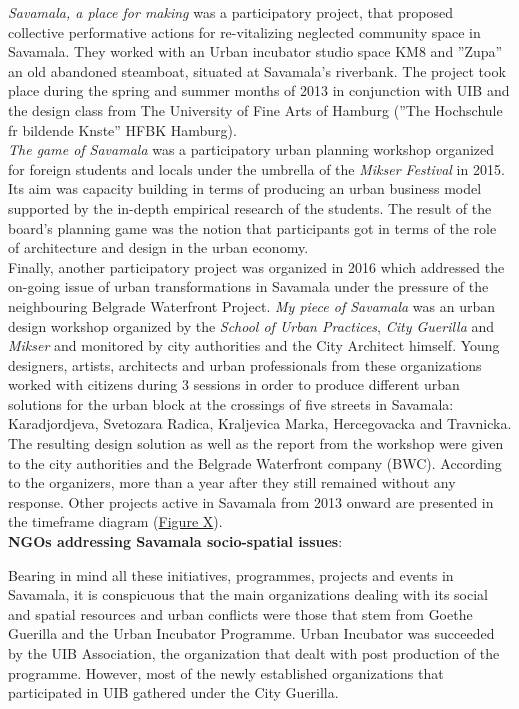 \documentclass[11pt]{report}
\begin{document}
\textit{Savamala, a place for making} was a participatory project, that proposed collective performative actions for re-vitalizing neglected community space in Savamala.
They worked with an Urban incubator studio space KM8 and ”Zupa” an old abandoned steamboat, situated at Savamala’s riverbank. The project took place during the spring and summer months of 2013 in conjunction with UIB and the design class from The University of Fine Arts of Hamburg (”The Hochschule fr bildende Knste” HFBK Hamburg).
\\

\textit{The game of Savamala} was a participatory urban planning workshop organized for foreign students and locals under the umbrella of the \textit{Mikser Festival} in 2015.
Its aim was capacity building in terms of producing an urban business model supported by the in-depth empirical research of the students. The result of the board’s planning game was the notion that participants got in terms of the role of architecture and design in the urban economy.
\\

Finally, another participatory project was organized in 2016 which addressed the on-going issue of urban transformations in Savamala under the pressure of the neighbouring Belgrade Waterfront Project.
\textit{My piece of Savamala}  was an urban design workshop organized by the \textit{School of Urban Practices}, \textit{City Guerilla} and \textit{Mikser} and monitored by city authorities and the City Architect himself.
Young designers, artists, architects and urban professionals from these organizations worked with citizens during 3 sessions in order to produce different urban solutions for the urban block at the crossings of five streets in Savamala: Karadjordjeva, Svetozara Radica, Kraljevica Marka, Hercegovacka and Travnicka. The resulting design solution as well as the report from the workshop were given to the city authorities and the Belgrade Waterfront company (BWC). According to the organizers, more than a year after they still remained without any response.
Other projects active in Savamala from 2013 onward are presented in the timeframe diagram (\href{FIgure Savamala PUD timeline}{Figure X}).
\\

\textbf{NGOs addressing Savamala socio-spatial issues}:

Bearing in mind all these initiatives, programmes, projects and events in Savamala, it is conspicuous that the main organizations dealing with its social and spatial resources and urban conflicts were those that stem from Goethe Guerilla and the Urban Incubator Programme. Urban Incubator was succeeded by the UIB Association, the organization that dealt with post production of the programme. However, most of the newly established organizations that participated in UIB gathered under the City Guerilla.
\\
\end{document}
